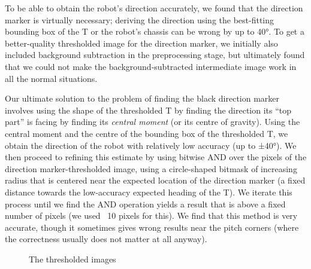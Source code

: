 \documentclass[12pt,a4paper,notitlepage,twocolumn]{report}
\begin{document}
To be able to obtain the robot’s direction accurately, we found that
the direction marker is virtually necessary; deriving the direction
using the best-fitting bounding box of the T or the robot’s chassis
can be wrong by up to 40°. To get a better-quality thresholded image
for the direction marker, we initially also included background
subtraction in the preprocessing stage, but ultimately found that we
could not make the background-subtracted intermediate image work in
all the normal situations.

Our ultimate solution to the problem of finding the black direction
marker involves using the shape of the thresholded T by finding the
direction its “top part” is facing by finding its \emph{central
  moment} (or its centre of gravity). Using the central moment and the
centre of the bounding box of the thresholded T, we obtain the
direction of the robot with relatively low accuracy (up to ±40°). We
then proceed to refining this estimate by using bitwise AND over the
pixels of the direction marker-thresholded image, using a
circle-shaped bitmask of increasing radius that is centered near the
expected location of the direction marker (a fixed distance towards
the low-accuracy expected heading of the T). We iterate this process
until we find the AND operation yields a result that is above a fixed
number of pixels (we used ~10 pixels for this). We find that this
method is very accurate, though it sometimes gives wrong results near
the pitch corners (where the correctness usually does not matter at
all anyway).

\begin{figure}[htp]
  \begin{center}
  \end{center}
  \caption{The thresholded images}
  \label{fig:thresh}
\end{figure}
\end{document}
